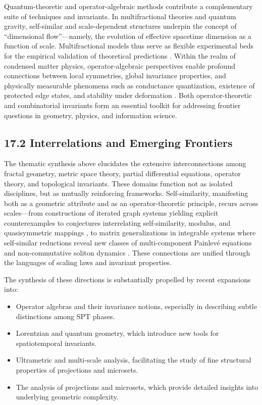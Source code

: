 \documentclass[11pt]{article}
\begin{document}
Quantum-theoretic and operator-algebraic methods contribute a complementary suite of techniques and invariants. In multifractional theories and quantum gravity, self-similar and scale-dependent structures underpin the concept of “dimensional flow”—namely, the evolution of effective spacetime dimension as a function of scale. Multifractional models thus serve as flexible experimental beds for the empirical validation of theoretical predictions \cite{ref5,ref7,ref20}. Within the realm of condensed matter physics, operator-algebraic perspectives enable profound connections between local symmetries, global invariance properties, and physically measurable phenomena such as conductance quantization, existence of protected edge states, and stability under deformation \cite{ref56,ref57,ref58}. Both operator-theoretic and combinatorial invariants form an essential toolkit for addressing frontier questions in geometry, physics, and information science.

\subsection{17.2 Interrelations and Emerging Frontiers}

The thematic synthesis above elucidates the extensive interconnections among fractal geometry, metric space theory, partial differential equations, operator theory, and topological invariants. These domains function not as isolated disciplines, but as mutually reinforcing frameworks. Self-similarity, manifesting both as a geometric attribute and as an operator-theoretic principle, recurs across scales—from constructions of iterated graph systems yielding explicit counterexamples to conjectures interrelating self-similarity, modulus, and quasisymmetric mappings \cite{ref35}, to matrix generalizations in integrable systems where self-similar reductions reveal new classes of multi-component Painlevé equations and non-commutative soliton dynamics \cite{ref64}. These connections are unified through the languages of scaling laws and invariant properties.

The synthesis of these directions is substantially propelled by recent expansions into:

\begin{itemize}
    \item Operator algebras and their invariance notions, especially in describing subtle distinctions among SPT phases.
    \item Lorentzian and quantum geometry, which introduce new tools for spatiotemporal invariants.
    \item Ultrametric and multi-scale analysis, facilitating the study of fine structural properties of projections and microsets.
    \item The analysis of projections and microsets, which provide detailed insights into underlying geometric complexity.
\end{itemize}
\end{document}
